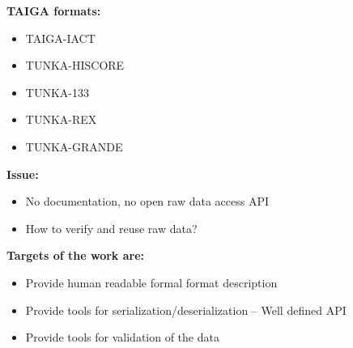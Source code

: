 \documentclass[a0paper,portrait]{baposter}
\begin{document}
\begin{poster}
{ \textbf{TAIGA formats:}
	 \begin{itemize}[noitemsep]
	  	\item TAIGA-IACT
	  	\item TUNKA-HISCORE
  		\item TUNKA-133
  		\item TUNKA-REX  
		  \item TUNKA-GRANDE
	  \end{itemize}
    \textbf{Issue:}
	  \begin{itemize}[noitemsep]
  		\item No documentation, no open raw data access API
  		\item How to verify and reuse raw data?  
  	\end{itemize}
    \textbf{Targets of the work are:}
	  \begin{itemize}[noitemsep,nolistsep]
  		\item Provide human readable formal format description 
  		\item Provide tools for serialization/deserialization
			– Well defined API
			\item Provide tools for validation of the data
  	\end{itemize}
}

\end{poster}
\end{document}
